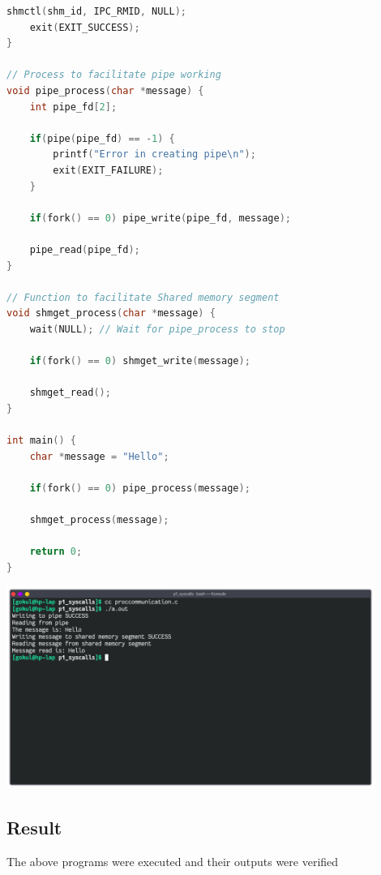 \begin{lstlisting}[language=C]
	shmctl(shm_id, IPC_RMID, NULL);
	exit(EXIT_SUCCESS);
}

// Process to facilitate pipe working
void pipe_process(char *message) {
	int pipe_fd[2];

	if(pipe(pipe_fd) == -1) {
		printf("Error in creating pipe\n");
		exit(EXIT_FAILURE);
	}

	if(fork() == 0) pipe_write(pipe_fd, message);

	pipe_read(pipe_fd);
}

// Function to facilitate Shared memory segment
void shmget_process(char *message) {
	wait(NULL); // Wait for pipe_process to stop

	if(fork() == 0) shmget_write(message);

	shmget_read();
}

int main() {
	char *message = "Hello";

	if(fork() == 0) pipe_process(message);

	shmget_process(message);

	return 0;
}
\end{lstlisting}

\begin{center}
	\includegraphics[width=0.90\textwidth]{img/p2/ss4.png}
\end{center}

\subsection{Result}
The above programs were executed and their outputs were verified